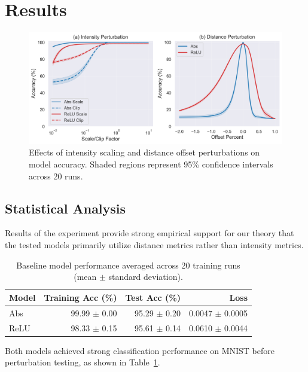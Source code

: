 \section{Results}

\begin{figure}[h]
    \centering
    \includegraphics[width=\textwidth]{images/perturbation_analysis}
    \caption{Effects of intensity scaling and distance offset perturbations on model accuracy. Shaded regions represent 95\% confidence intervals across 20 runs.}
    \label{fig:perturbation_analysis}
    \end{figure}
\subsection{Statistical Analysis}

    

Results of the experiment provide strong empirical support for our theory that the tested models primarily utilize distance metrics rather than intensity metrics.

\begin{table}[h]
    \centering
    \begin{tabular}{lrrr}
    \hline
    Model & Training Acc (\%) & Test Acc (\%) & Loss \\
    \hline
    Abs & 99.99 $\pm$ 0.00 & 95.29 $\pm$ 0.20 & 0.0047 $\pm$ 0.0005 \\
    ReLU & 98.33 $\pm$ 0.15 & 95.61 $\pm$ 0.14 & 0.0610 $\pm$ 0.0044 \\
    \hline
    \end{tabular}
    \caption{Baseline model performance averaged across 20 training runs (mean $\pm$ standard deviation).}
    \label{tab:baseline}
\end{table}

Both models achieved strong classification performance on MNIST before perturbation testing, as shown in Table~\ref{tab:baseline}.


